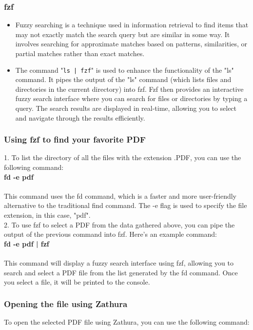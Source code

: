 \documentclass[12pt]{article}
\begin{document}
\subsubsection{fzf}
\begin{itemize}
	\item Fuzzy searching is a technique used in information retrieval to find items that may not exactly match the search query but are similar in some way. It involves searching for approximate matches based on patterns, similarities, or partial matches rather than exact matches.
	\item The command "\texttt{ls | fzf}" is used to enhance the functionality of the "ls" command. It pipes the output of the "ls" command (which lists files and directories in the current directory) into fzf. Fzf then provides an interactive fuzzy search interface where you can search for files or directories by typing a query. The search results are displayed in real-time, allowing you to select and navigate through the results efficiently.
	
\end{itemize}

\subsubsection{Using fzf to find your favorite PDF}
1. To list the directory of all the files with the extension .PDF, you can use the following command:\\

\textbf{fd -e pdf}\\
\\This command uses the fd command, which is a faster and more user-friendly alternative to the traditional find command. The -e flag is used to specify the file extension, in this case, "pdf".\\
2. To use fzf to select a PDF from the data gathered above, you can pipe the output of the previous command into fzf. Here's an example command:\\


\textbf{fd -e pdf | fzf}\\
\\This command will display a fuzzy search interface using fzf, allowing you to search and select a PDF file from the list generated by the fd command. Once you select a file, it will be printed to the console.

\subsubsection{Opening the file using Zathura}
To open the selected PDF file using Zathura, you can use the following command:\\
\end{document}

